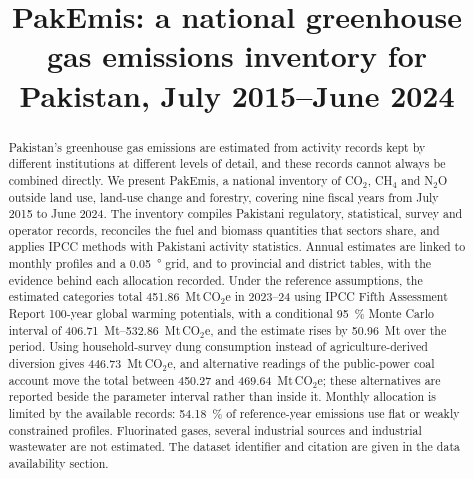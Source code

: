 \documentclass[essd,manuscript]{copernicus}
\begin{document}
\title{PakEmis: a national greenhouse gas emissions inventory for Pakistan, July 2015--June 2024}
\received{}
\pubdiscuss{}
\revised{}
\accepted{}
\published{}
\maketitle

\begin{abstract}
Pakistan's greenhouse gas emissions are estimated from activity records kept by different institutions at different levels of detail, and these records cannot always be combined directly. We present PakEmis, a national inventory of CO$_2$, CH$_4$ and N$_2$O outside land use, land-use change and forestry, covering nine fiscal years from July 2015 to June 2024. The inventory compiles Pakistani regulatory, statistical, survey and operator records, reconciles the fuel and biomass quantities that sectors share, and applies IPCC methods with Pakistani activity statistics. Annual estimates are linked to monthly profiles and a \SI{0.05}{\degree} grid, and to provincial and district tables, with the evidence behind each allocation recorded. Under the reference assumptions, the estimated categories total \SI{451.86}{\mega\tonne}\,CO$_2$e in 2023--24 using IPCC Fifth Assessment Report 100-year global warming potentials, with a conditional \SI{95}{\percent} Monte Carlo interval of \SIrange{406.71}{532.86}{\mega\tonne}\,CO$_2$e, and the estimate rises by \SI{50.96}{\mega\tonne} over the period. Using household-survey dung consumption instead of agriculture-derived diversion gives \SI{446.73}{\mega\tonne}\,CO$_2$e, and alternative readings of the public-power coal account move the total between \SI{450.27}{} and \SI{469.64}{\mega\tonne}\,CO$_2$e; these alternatives are reported beside the parameter interval rather than inside it. Monthly allocation is limited by the available records: \SI{54.18}{\percent} of reference-year emissions use flat or weakly constrained profiles. Fluorinated gases, several industrial sources and industrial wastewater are not estimated. The dataset identifier and citation are given in the data availability section.
\end{abstract}
\end{document}
